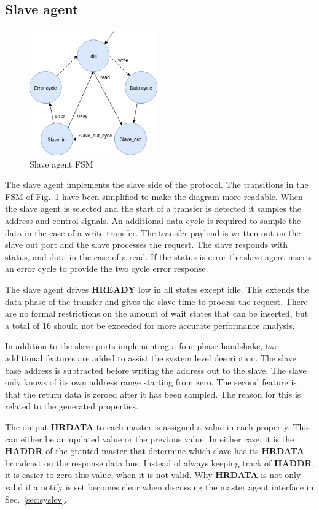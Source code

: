 \subsection{Slave agent}
\begin{figure}
\includegraphics[width=5.5cm]{figs/hw/sAgent_FSM.png}
\caption{Slave agent FSM}\label{fig:rsfsm}
\end{figure}  

The slave agent implements the slave side of the protocol. The transitions in the FSM of Fig.~\ref{fig:rsfsm} have been simplified to make the diagram more readable. When the slave agent is selected and the start of a transfer is detected it samples the address and control signals. An additional data cycle is
required to sample the data in the case of a write transfer. The transfer payload is written out on the slave out port and the slave processes the request. The slave responds with status, and data in the case of a read. If the status is error the slave agent inserts an error cycle to provide the two cycle error response. \par
The slave agent drives \textbf{HREADY} low in all states except idle. This extends the data phase of the transfer and gives the slave time to process the request. There are no formal restrictions on the amount of wait states that can be inserted, but a total of 16 should not be exceeded for more accurate performance analysis. \par
In addition to the slave ports implementing a four phase handshake, two additional features are added to assist the system level description. The slave base address is subtracted before writing the address out to the slave. The slave only knows of its own address range starting from zero. The second feature is that the return data is zeroed after it has been sampled. The reason for this is related to the generated properties. \par
The output \textbf{HRDATA} to each master is assigned a value in each property. This can either be an updated value or the previous value. In either case, it is the \textbf{HADDR} of the granted master that determine which slave has its \textbf{HRDATA} broadcast on the response data bus. Instead of always keeping track of \textbf{HADDR}, it is easier to zero this value, when it is not valid. Why \textbf{HRDATA} is not only valid if a notify is set becomes clear when discussing the master agent interface in Sec.~\ref{sec:syslev}.   
\newpage

